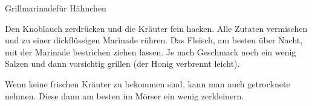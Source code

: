 \begin{recipe}{Grillmarinade}{für Hähnchen}
  \label{Marinade}
  \inglist[Zutaten:]

  \steps
  Den Knoblauch zerdrücken und die Kräuter fein hacken. Alle Zutaten vermischen
  und zu einer dickflüssigen Marinade rühren. Das Fleisch, am besten über Nacht,
  mit der Marinade bestrichen ziehen lassen. Je nach Geschmack noch ein wenig
  Salzen und dann vorsichtig grillen (der Honig verbrennt leicht).

  Wenn keine frischen Kräuter zu bekommen sind, kann man auch getrocknete
  nehmen. Diese dann am besten im Mörser ein wenig zerkleinern.
\end{recipe}
